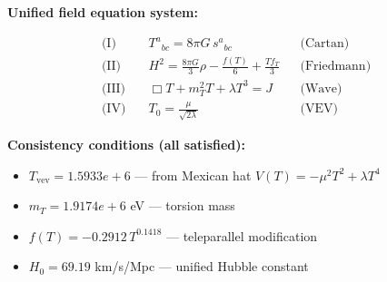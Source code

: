 
\textbf{Unified field equation system:}

\begin{align}
  \text{(I)} \quad & T^a{}_{bc} = 8\pi G \, s^a{}_{bc} && \text{(Cartan)} \\
  \text{(II)} \quad & H^2 = \frac{8\pi G}{3}\rho - \frac{f(T)}{6} + \frac{Tf_T}{3} && \text{(Friedmann)} \\
  \text{(III)} \quad & \Box T + m_T^2 T + \lambda T^3 = J && \text{(Wave)} \\
  \text{(IV)} \quad & T_0 = \frac{\mu}{\sqrt{2\lambda}} && \text{(VEV)}
\end{align}

\textbf{Consistency conditions (all satisfied):}
\begin{itemize}
  \item $T_{\text{vev}} = 1.5933e+6$ — from Mexican hat $V(T) = -\mu^2 T^2 + \lambda T^4$
  \item $m_T = 1.9174e+6$ eV — torsion mass
  \item $f(T) = -0.2912 \, T^{0.1418}$ — teleparallel modification
  \item $H_0 = 69.19$ km/s/Mpc — unified Hubble constant
\end{itemize}